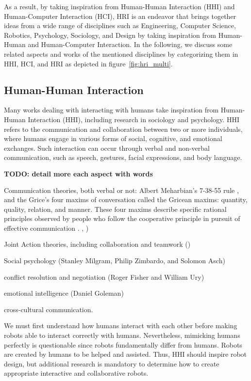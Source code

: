 As a result, by taking inspiration from Human-Human Interaction (HHI) and Human-Computer Interaction (HCI), HRI is an endeavor that brings together ideas from a wide range of disciplines such as Engineering, Computer Science, Robotics, Psychology, Sociology, and Design by taking inspiration from Human-Human and Human-Computer Interaction.
In the following, we discuss some related aspects and works of the mentioned disciplines by categorizing them in HHI, HCI, and HRI as depicted in figure~\ref{fig:hri_multi}.

\subsection{Human-Human Interaction}

Many works dealing with interacting with humans take inspiration from Human-Human Interaction (HHI), including research in sociology and psychology. HHI refers to the communication and collaboration between two or more individuals, where humans engage in various forms of social, cognitive, and emotional exchanges. Such interaction can occur through verbal and non-verbal communication, such as speech, gestures, facial expressions, and body language.   

\textbf{TODO: detail more each aspect with words}

Communication theories, both verbal or not: Albert Meharbian's 7-38-55 rule \cite{mehrabian1967decoding}, and the Grice's four maxims of conversation called the Gricean maxims: quantity, quality, relation, and manner. These four maxims describe specific rational principles observed by people who follow the cooperative principle in pursuit of effective communication \cite{grice1975logic}.
\cite{smith_designing_1998}, \cite{cherry_human_nodate})

Joint Action theories, including collaboration and teamwork (\cite{cohen_teamwork_1991,cohen_team_1970,levesque_acting_1990})

Social psychology (Stanley Milgram, Philip Zimbardo, and Solomon Asch)

conflict resolution and negotiation (Roger Fisher and William Ury)

emotional intelligence (Daniel Goleman)

cross-cultural communication.


We must first understand how humans interact with each other before making robots able to interact correctly with humans. Nevertheless, mimicking humans perfectly is questionable since robots fundamentally differ from humans. Robots are created by humans to be helped and assisted. Thus, HHI should inspire robot design, but additional research is mandatory to determine how to create appropriate interactive and collaborative robots.

